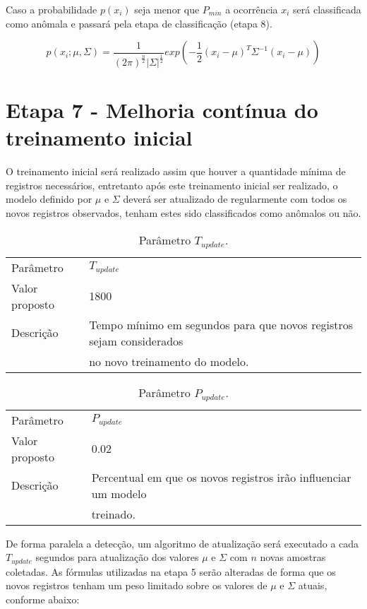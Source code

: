 Caso a probabilidade $p(x_i)$ seja menor que $P_{min}$ a ocorrência $x_i$ será
classificada como anômala e passará pela etapa de classificação (etapa 8).

\begingroup
\Large
\begin{equation}
p(x_i; \mu, \Sigma) = \frac{1}{(2 \pi)^{\frac{n}{2}} | \Sigma |^{\frac{1}{2}} } exp \left( - \frac{1}{2} ( x_i - \mu )^{T} \Sigma^{-1} ( x_i - \mu ) \right)
\end{equation}
\endgroup

\section{Etapa 7 - Melhoria contínua do treinamento inicial}
\label{sec:etapa-7}

O treinamento inicial será realizado assim que houver a quantidade mínima de
registros necessários, entretanto após este treinamento inicial ser realizado,
o modelo definido por $\mu$ e $\Sigma$ deverá ser atualizado de regularmente
com todos os novos registros observados, tenham estes sido classificados como
anômalos ou não.

\begin{table}[H]
\caption{Parâmetro $T_{update}$.}
\vspace{0.25cm}
\begin{tabular}{ll}
Parâmetro      & $T_{update}$ \\
Valor proposto & 1800 \\
Descrição      & Tempo mínimo em segundos para que novos registros sejam considerados \\
               & no novo treinamento do modelo.
\end{tabular}
\end{table}

\begin{table}[H]
\caption{Parâmetro $P_{update}$.}
\vspace{0.25cm}
\begin{tabular}{ll}
Parâmetro      & $P_{update}$ \\
Valor proposto & 0.02 \\
Descrição      & Percentual em que os novos registros irão influenciar um modelo \\
               & treinado.
\end{tabular}
\end{table}

De forma paralela a detecção, um algoritmo de atualização será executado a
cada $T_{update}$ segundos para atualização dos valores $\mu$ e $\Sigma$ com $n$
novas amostras coletadas. As fórmulas utilizadas na etapa 5 serão alteradas de
forma que os novos registros tenham um peso limitado sobre os valores de $\mu$
e $\Sigma$ atuais, conforme abaixo:

